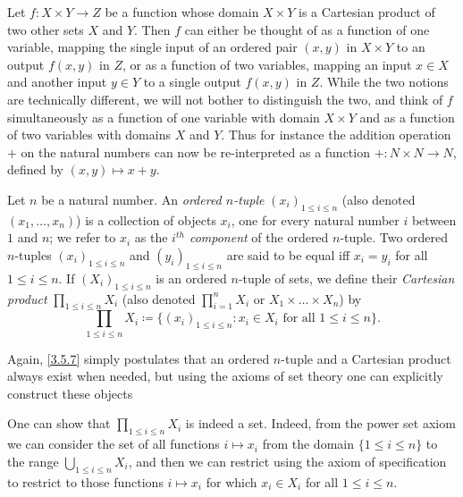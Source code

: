 \begin{note}
  Let \(f : X \times Y \to Z\) be a function whose domain \(X \times Y\) is a Cartesian product of two other sets \(X\) and \(Y\).
  Then \(f\) can either be thought of as a function of one variable, mapping the single input of an ordered pair \((x, y)\) in \(X \times Y\) to an output \(f(x, y)\) in \(Z\), or as a function of two variables, mapping an input \(x \in X\) and another input \(y \in Y\) to a single output \(f(x, y)\) in \(Z\).
  While the two notions are technically different, we will not bother to distinguish the two, and think of \(f\) simultaneously as a function of one variable with domain \(X \times Y\) and as a function of two variables with domains \(X\) and \(Y\).
  Thus for instance the addition operation \(+\) on the natural numbers can now be re-interpreted as a function \(+ : N \times N \to N\), defined by \((x, y) \mapsto x + y\).
\end{note}

\setcounter{thm}{6}
\begin{defn}\label{3.5.7}
  Let \(n\) be a natural number.
  An \emph{ordered \(n\)-tuple} \((x_i)_{1 \leq i \leq n}\) (also denoted \((x_1, \dots, x_n)\)) is a collection of objects \(x_i\), one for every natural number \(i\) between \(1\) and \(n\);
  we refer to \(x_i\) as the \emph{\(i^{th}\) component} of the ordered \(n\)-tuple.
  Two ordered \(n\)-tuples \((x_i)_{1 \leq i \leq n}\) and \((y_i)_{1 \leq i \leq n}\) are said to be equal iff \(x_i = y_i\) for all \(1 \leq i \leq n\).
  If \((X_i)_{1 \leq i \leq n}\) is an ordered \(n\)-tuple of sets, we define their \emph{Cartesian product} \(\prod_{1 \leq i \leq n} X_i\) (also denoted \(\prod_{i=1}^n X_i\) or \(X_1 \times \dots \times X_n\)) by
  \[
    \prod_{1 \leq i \leq n} X_i \coloneqq \{(x_i)_{1 \leq i \leq n} : x_i \in X_i \text{ for all } 1 \leq i \leq n\}.
  \]
\end{defn}

\begin{note}
  Again, \cref{3.5.7} simply postulates that an ordered \(n\)-tuple and a Cartesian product always exist when needed, but using the axioms of set theory one can explicitly construct these objects
\end{note}

\begin{rmk}\label{3.5.8}
  One can show that \(\prod_{1 \leq i \leq n} X_i\) is indeed a set.
  Indeed, from the power set axiom we can consider the set of all functions \(i \mapsto x_i\) from the domain \(\{1 \leq i \leq n\}\) to the range \(\bigcup_{1 \leq i \leq n} X_i\), and then we can restrict using the axiom of specification to restrict to those functions \(i \mapsto x_i\) for which \(x_i \in X_i\) for all \(1 \leq i \leq n\).
\end{rmk}

